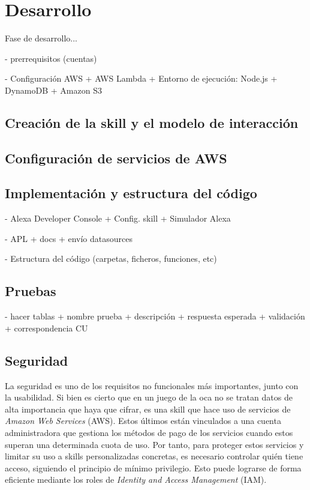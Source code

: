 \section{Desarrollo}
Fase de desarrollo...

- prerrequisitos (cuentas)

- Configuración AWS
+ AWS Lambda
+ Entorno de ejecución: Node.js
+ DynamoDB
+ Amazon S3

\subsection{Creación de la skill y el modelo de interacción}

\subsection{Configuración de servicios de AWS}


\subsection{Implementación y estructura del código}



- Alexa Developer Console
+ Config. skill
+ Simulador Alexa

- APL
+ docs
+ envío datasources

- Estructura del código (carpetas, ficheros, funciones, etc)

\subsection{Pruebas}
- hacer tablas
+ nombre prueba
+ descripción
+ respuesta esperada
+ validación
+ correspondencia CU

\subsection{Seguridad}

La seguridad es uno de los requisitos no funcionales más importantes, junto con la usabilidad. Si bien es cierto que en un juego de la oca no se tratan datos de alta importancia que haya que cifrar, es una skill que hace uso de servicios de \textit{Amazon Web Services} (AWS). Estos últimos están vinculados a una cuenta administradora que gestiona los métodos de pago de los servicios cuando estos superan una determinada cuota de uso. Por tanto, para proteger estos servicios y limitar su uso a skills personalizadas concretas, es necesario controlar quién tiene acceso, siguiendo el principio de mínimo privilegio. Esto puede lograrse de forma eficiente mediante los roles de \textit{Identity and Access Management} (IAM).

